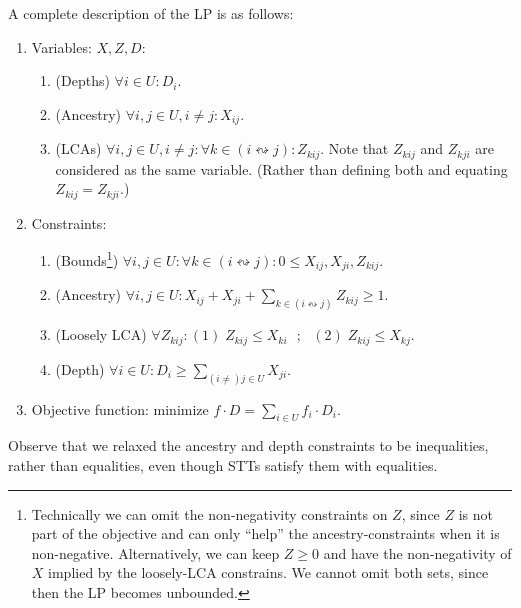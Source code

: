 \begin{definition}[STT LP]
\label{definition_LP_program}
A complete description of the LP is as follows:
    \begin{enumerate}
        \item Variables: $X,Z,D$:
            \begin{enumerate}
                \item (Depths) $\forall i \in U: D_{i}$.
                \item (Ancestry) $\forall i,j \in U, i \ne j: X_{ij}$.
                \item (LCAs) $\forall i,j \in U, i \ne j: \forall k \in (i \leftrightsquigarrow j):  Z_{kij}$. Note that $Z_{kij}$ and $Z_{kji}$ are considered as the same variable. (Rather than defining both and equating $Z_{kij}=Z_{kji}$.)
            \end{enumerate}
        \item Constraints:
        \begin{enumerate}
            \item (Bounds\footnote{Technically we can omit the non-negativity constraints on $Z$, since $Z$ is not part of the objective and can only ``help'' the ancestry-constraints when it is non-negative. Alternatively, we can keep $Z \ge 0$ and have the non-negativity of $X$ implied by the loosely-LCA constrains. We cannot omit both sets, since then the LP becomes unbounded.}) $\forall i,j \in U: \forall k \in (i \leftrightsquigarrow j): 0 \le X_{ij},X_{ji},Z_{kij}$.
            \item (Ancestry) $\forall i,j \in U: X_{ij} + X_{ji} + \sum_{k \in (i \leftrightsquigarrow j)}{Z_{kij}} \ge 1$.
            \item (Loosely LCA) $\forall Z_{kij}: (1) \; Z_{kij} \le X_{ki} \ \ \ ; \ \ \ (2) \; Z_{kij} \le X_{kj}$.
            \item (Depth) $\forall i \in U: D_i \ge \sum_{(i \ne) j \in U}{X_{ji}}$.
        \end{enumerate}
        \item Objective function: minimize $f \cdot D = \sum_{i \in U}{f_i \cdot D_i}$.
    \end{enumerate}
\end{definition}

Observe that we relaxed the ancestry and depth constraints to be inequalities, rather than equalities, even though STTs satisfy them with equalities.


